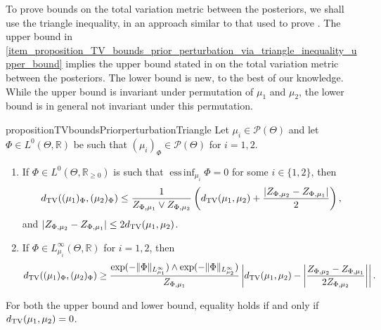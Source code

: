 \documentclass[a4paper]{scrartcl}
\theoremstyle{definition}
\numberwithin{equation}{section}
\newcommand{\R}{\mathbb{R}}
\DeclareMathOperator*{\essinf}{ess\,inf}
\newcommand{\abs}[1]{\vert #1\vert}
\newcommand{\Abs}[1]{\left\vert#1\right\vert}
\newcommand{\norm}[1]{\Vert #1 \Vert}
\newcommand{\TV}[0]{\textup{TV}}
\begin{document}
To prove bounds on the total variation metric between the posteriors, we shall use the triangle inequality, in an approach similar to that used to prove .
The upper bound in  \ref{item_proposition_TV_bounds_prior_perturbation_via_triangle_inequality_upper_bound} implies the upper bound stated in \cite[Theorem 8]{Sprungk2020} on the total variation metric between the posteriors.
The lower bound is new, to the best of our knowledge.
While the upper bound is invariant under permutation of $\mu_1$ and $\mu_2$, the lower bound is in general not invariant under this permutation.
\begin{restatable}{proposition}{TVboundsPriorperturbationTriangle}
 \label{proposition_TV_bounds_prior_perturbation_via_triangle_inequality}
 Let $\mu_i\in\mathcal{P}(\Theta)$ and let $\Phi\in L^0(\Theta,\R)$ be such that $(\mu_i)_\Phi\in\mathcal{P}(\Theta)$ for $i=1,2$. 
 \begin{enumerate}
  \item \label{item_proposition_TV_bounds_prior_perturbation_via_triangle_inequality_upper_bound} If $\Phi\in L^0(\Theta,\R_{\geq 0})$ is such that $\essinf_{\mu_i}\Phi=0$ for some $i\in\{1,2\}$, then 
  \begin{equation*}
   d_{\TV}((\mu_1)_\Phi,(\mu_2)_\Phi)\leq \frac{1}{Z_{\Phi,\mu_1}\vee Z_{\Phi,\mu_2}}\left(d_{\TV}(\mu_1,\mu_2)
+\frac{\abs{Z_{\Phi,\mu_2}-Z_{\Phi,\mu_1}}}{2} \right),
  \end{equation*}
   and $\abs{Z_{\Phi,\mu_2}-Z_{\Phi,\mu_1}}\leq 2d_{\TV}(\mu_1,\mu_2)$.
  \item \label{item_proposition_TV_bounds_prior_perturbation_via_triangle_inequality_lower_bound}
 If $\Phi\in L^\infty_{\mu_i}(\Theta,\R)$ for $i=1,2$, then
 \begin{equation*}
  d_{\TV}((\mu_1)_\Phi,(\mu_2)_\Phi)\geq  \frac{\exp(-\norm{\Phi}_{L^\infty_{\mu_1}})\wedge \exp(-\norm{\Phi}_{L^\infty_{\mu_2}})}{Z_{\Phi,\mu_1}} \Abs{d_{\TV}(\mu_1,\mu_2)- \Abs{ \frac{Z_{\Phi,\mu_2}-Z_{\Phi,\mu_1}}{2Z_{\Phi,\mu_2}} }}.
 \end{equation*}  
 \end{enumerate}
 For both the upper bound and lower bound, equality holds if and only if $d_{\TV}(\mu_1,\mu_2)=0$.
\end{restatable}
\end{document}
